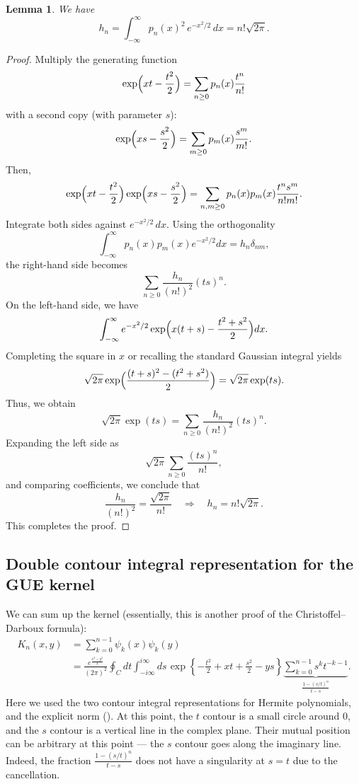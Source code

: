 \documentclass[letterpaper,11pt,oneside,reqno]{article}
\numberwithin{equation}{section}
\newcommand{\ssp}{\hspace{1pt}}
\newtheorem{lemma}[proposition]{Lemma}
\theoremstyle{definition}
\begin{document}
\begin{lemma}
	\label{lem:hermite_norm}
	We have
	\begin{equation*}
		h_n=\int_{-\infty}^{\infty} p_n(x)^2\,e^{-x^2/2}\,dx=n!\sqrt{2\pi}.
	\end{equation*}
\end{lemma}
\begin{proof}
Multiply the generating function
\[
	\exp\Bigl(xt-\frac{t^2}{2}\Bigr)=\sum_{n\ge0}p_n(x)\frac{t^n}{n!}
\]
with a second copy (with parameter \(s\)):
\[
	\exp\Bigl(xs-\frac{s^2}{2}\Bigr)=\sum_{m\ge0}p_m(x)\frac{s^m}{m!}.
\]
Then,
\[
	\exp\Bigl(xt-\frac{t^2}{2}\Bigr)\exp\Bigl(xs-\frac{s^2}{2}\Bigr)
	=\sum_{n,m\ge0}p_n(x)p_m(x)\frac{t^n s^m}{n!m!}.
\]
Integrate both sides against \(e^{-x^2/2}\,dx\). Using the orthogonality
\[
	\int_{-\infty}^{\infty}p_n(x)p_m(x)e^{-x^2/2}dx=h_n\delta_{nm},
\]
the right-hand side becomes
\[
	\sum_{n\ge0}\frac{h_n}{(n!)^2}(ts)^n.
\]
On the left-hand side, we have
\[
	\int_{-\infty}^{\infty}e^{-x^2/2}\exp\Bigl(x(t+s)-\frac{t^2+s^2}{2}\Bigr)dx.
\]
Completing the square in \(x\) or recalling the standard Gaussian integral yields
\[
	\sqrt{2\pi}\exp\Bigl(\frac{(t+s)^2-(t^2+s^2)}{2}\Bigr)
	=\sqrt{2\pi}\exp(ts).
\]
Thus, we obtain
\[
	\sqrt{2\pi}\exp(ts)=\sum_{n\ge0}\frac{h_n}{(n!)^2}(ts)^n.
\]
Expanding the left side as
\[
	\sqrt{2\pi}\sum_{n\ge0}\frac{(ts)^n}{n!},
\]
and comparing coefficients, we conclude that
\[
	\frac{h_n}{(n!)^2}=\frac{\sqrt{2\pi}}{n!}\quad\Longrightarrow\quad h_n=n!\sqrt{2\pi}.
\]
This completes the proof.
\end{proof}

\subsection{Double contour integral representation for the GUE kernel}

We can sum up the kernel (essentially, this is
another proof of the Christoffel--Darboux formula):
\begin{equation}\begin{split}
	K_n(x,y)&=
	\sum_{k=0}^{n-1}\psi_k(x)\psi_k(y)
	\\&=
	\frac{e^{\frac{x^2-y^2}{4}}}{(2\pi)^2}
	\oint_C dt\int_{-i\infty}^{i\infty}ds\ssp
	\exp\left\{ -\frac{t^2}{2}+xt+\frac{s^2}{2}-ys \right\}
	\underbrace{\sum_{k=0}^{n-1}
	s^k t^{-k-1}}_{\frac{1-(s/t)^n}{t-s}}.
\end{split}\label{eq:K_n_sum}\end{equation}
Here we used the two contour integral representations for Hermite polynomials,
and the explicit norm ().
At this point, the $t$ contour is a small circle around $0$, and
the $s$ contour is a vertical line in the complex plane.
Their mutual position can be arbitrary at this point --- the $s$ contour
goes along the imaginary line.
Indeed, the fraction
$\frac{1-(s/t)^n}{t-s}$ does not have a singularity at $s=t$ due to the
cancellation.
\end{document}
